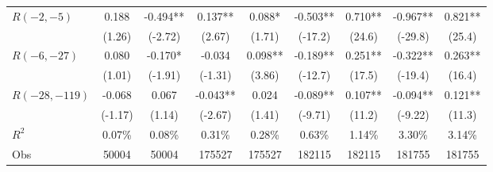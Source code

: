 \documentclass{beamer}
\begin{document}
\begin{frame}
\begin{table}
{\begin{tabular}{l*{8}{c}}
                \(R(-2,-5)\)    & 0.188                             & -0.494**                                                        & 0.137**                     & 0.088*                           & -0.503**                     & 0.710** & -0.967** & 0.821** \\ %
                                & (1.26)                            & (-2.72)                                                         & (2.67)                      & (1.71)                           & (-17.2)                      & (24.6)  & (-29.8)  & (25.4)  \\
                \addlinespace
                \(R(-6,-27)\)   & 0.080                             & -0.170*                                                         & -0.034                      & 0.098**                          & -0.189**                     & 0.251** & -0.322** & 0.263** \\
                                & (1.01)                            & (-1.91)                                                         & (-1.31)                     & (3.86)                           & (-12.7)                      & (17.5)  & (-19.4)  & (16.4)  \\
                \addlinespace
                \(R(-28,-119)\) & -0.068                            & 0.067                                                           & -0.043**                    & 0.024                            & -0.089**                     & 0.107** & -0.094** & 0.121** \\
                                & (-1.17)                           & (1.14)                                                          & (-2.67)                     & (1.41)                           & (-9.71)                      & (11.2)  & (-9.22)  & (11.3)  \\
                \addlinespace

                \(R^{2}\)       & 0.07\%                            & 0.08\%                                                          & 0.31\%                      & 0.28\%                           & 0.63\%                       & 1.14\%  & 3.30\%   & 3.14\%  \\
                Obs             & 50004                             & 50004                                                           & 175527                      & 175527                           & 182115                       & 182115  & 181755   & 181755  \\


\end{tabular}}
\end{table}
\end{frame}
\end{document}
